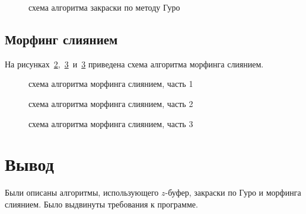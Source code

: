 \begin{figure}[h]
	\centering
	
	\caption{схема алгоритма закраски по методу Гуро}
	\label{fig:guro}
\end{figure}

\clearpage

\subsection{Морфинг слиянием}

На рисунках~\ref{fig:morph1},~\ref{fig:morph2}~и~\ref{fig:morph2} приведена схема алгоритма морфинга слиянием.

\begin{figure}[h]
	\centering
	
	\caption{схема алгоритма морфинга слиянием, часть 1}
	\label{fig:morph1}
\end{figure}

\begin{figure}[h]
	\centering
	
	\caption{схема алгоритма морфинга слиянием, часть 2}
	\label{fig:morph2}
\end{figure}

\clearpage

\begin{figure}[h]
	\centering
	
	\caption{схема алгоритма морфинга слиянием, часть 3}
	\label{fig:morph3}
\end{figure}

\section*{Вывод}
Были описаны алгоритмы, использующего $z$-буфер, закраски по Гуро и морфинга слиянием. Было выдвинуты требования к программе.